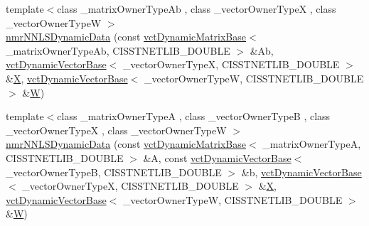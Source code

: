 {\bf }\par
\begin{DoxyCompactItemize}
\item 
{\footnotesize template$<$class \+\_\+matrix\+Owner\+Type\+Ab , class \+\_\+vector\+Owner\+Type\+X , class \+\_\+vector\+Owner\+Type\+W $>$ }\\\hyperlink{classnmr_n_n_l_s_dynamic_data_a5247373fa1b76245d661934f5b8410e7}{nmr\+N\+N\+L\+S\+Dynamic\+Data} (const \hyperlink{classvct_dynamic_matrix_base}{vct\+Dynamic\+Matrix\+Base}$<$ \+\_\+matrix\+Owner\+Type\+Ab, C\+I\+S\+S\+T\+N\+E\+T\+L\+I\+B\+\_\+\+D\+O\+U\+B\+L\+E $>$ \&Ab, \hyperlink{classvct_dynamic_vector_base}{vct\+Dynamic\+Vector\+Base}$<$ \+\_\+vector\+Owner\+Type\+X, C\+I\+S\+S\+T\+N\+E\+T\+L\+I\+B\+\_\+\+D\+O\+U\+B\+L\+E $>$ \&\hyperlink{classnmr_n_n_l_s_dynamic_data_a2c67d4c5f9eff20ae015e60f85718f02}{X}, \hyperlink{classvct_dynamic_vector_base}{vct\+Dynamic\+Vector\+Base}$<$ \+\_\+vector\+Owner\+Type\+W, C\+I\+S\+S\+T\+N\+E\+T\+L\+I\+B\+\_\+\+D\+O\+U\+B\+L\+E $>$ \&\hyperlink{classnmr_n_n_l_s_dynamic_data_ae3204dc027313115b092088253dc4bb0}{W})
\item 
{\footnotesize template$<$class \+\_\+matrix\+Owner\+Type\+A , class \+\_\+vector\+Owner\+Type\+B , class \+\_\+vector\+Owner\+Type\+X , class \+\_\+vector\+Owner\+Type\+W $>$ }\\\hyperlink{classnmr_n_n_l_s_dynamic_data_a2fbb6dd98b0daec60d16fb32700d5a5c}{nmr\+N\+N\+L\+S\+Dynamic\+Data} (const \hyperlink{classvct_dynamic_matrix_base}{vct\+Dynamic\+Matrix\+Base}$<$ \+\_\+matrix\+Owner\+Type\+A, C\+I\+S\+S\+T\+N\+E\+T\+L\+I\+B\+\_\+\+D\+O\+U\+B\+L\+E $>$ \&A, const \hyperlink{classvct_dynamic_vector_base}{vct\+Dynamic\+Vector\+Base}$<$ \+\_\+vector\+Owner\+Type\+B, C\+I\+S\+S\+T\+N\+E\+T\+L\+I\+B\+\_\+\+D\+O\+U\+B\+L\+E $>$ \&b, \hyperlink{classvct_dynamic_vector_base}{vct\+Dynamic\+Vector\+Base}$<$ \+\_\+vector\+Owner\+Type\+X, C\+I\+S\+S\+T\+N\+E\+T\+L\+I\+B\+\_\+\+D\+O\+U\+B\+L\+E $>$ \&\hyperlink{classnmr_n_n_l_s_dynamic_data_a2c67d4c5f9eff20ae015e60f85718f02}{X}, \hyperlink{classvct_dynamic_vector_base}{vct\+Dynamic\+Vector\+Base}$<$ \+\_\+vector\+Owner\+Type\+W, C\+I\+S\+S\+T\+N\+E\+T\+L\+I\+B\+\_\+\+D\+O\+U\+B\+L\+E $>$ \&\hyperlink{classnmr_n_n_l_s_dynamic_data_ae3204dc027313115b092088253dc4bb0}{W})
\end{DoxyCompactItemize}

